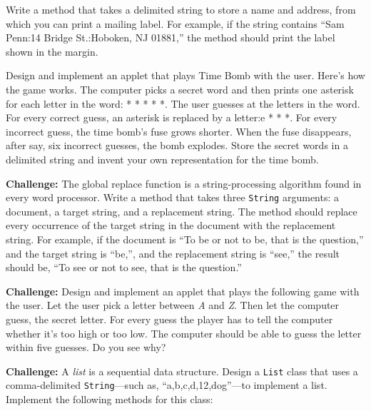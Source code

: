 \begin{EXRtwo}
\item  Write a method that takes a delimited string to
store a name and address, from which you can print a mailing label.  For example, if
the string contains ``Sam Penn:14 Bridge St.:Hoboken, NJ 01881,''
the method should print the label shown in the margin.

\item  Design and implement an applet that plays Time Bomb with the user.
Here's how the game works.  The computer picks a secret word and then
prints one asterisk for each letter in the word: * * * * *.  The user
guesses at the letters in the word.   For every correct guess, an
asterisk is replaced by a letter:\break * e * * *.  For every incorrect
guess, the time bomb's fuse grows shorter.  When the fuse disappears,
after say, six incorrect guesses, the bomb explodes.  Store the secret
words in a delimited string and invent your own representation for
the time bomb.

\item {\bf Challenge: } The global replace function is a
string-processing algorithm found in every word processor.  Write a
method that takes three {\tt String} arguments: a document, a target
string, and a replacement string.  The method should replace every
occurrence of the target string in the document with the replacement
string.  For example, if the document is ``To be or not to be, that is
the question,'' and the target string is ``be,'', and the replacement
string is ``see,'' the result should be, ``To see or not to see, that
is the question.''

\item  {\bf Challenge: } Design and implement an applet that plays
the following game with the user.  Let the user pick a letter between
{\it A} and {\it Z}. Then let the computer guess, the secret letter.  For
every guess the player has to tell the computer whether it's too
high or too low.  The computer should be able to guess the letter
within five guesses.  Do you see why?

\item  {\bf Challenge:} A {\it list} is a sequential
data structure.  Design a {\tt List} class that uses a comma-delimited
{\tt String}---such as, ``a,b,c,d,12,dog''---to implement a list.
Implement the following methods for this class:


\end{EXRtwo}
